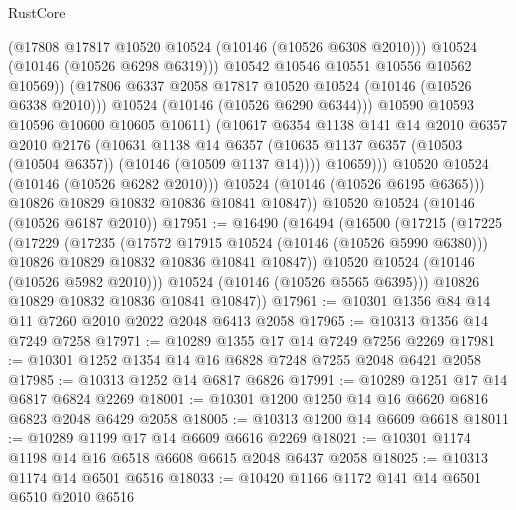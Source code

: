 \begin{lexlean}{RustCore}
\begin{coremodule}
                          (@17808 @17817 @10520 @10524 (@10146 (@10526 @6308 @2010)))
                          @10524
                          (@10146 (@10526 @6298 @6319)))
                        @10542
                        @10546
                        @10551
                        @10556
                        @10562
                        @10569))
                    (@17806 @6337 @2058 @17817 @10520 @10524 (@10146 (@10526 @6338 @2010)))
                    @10524
                    (@10146 (@10526 @6290 @6344)))
                  @10590
                  @10593
                  @10596
                  @10600
                  @10605
                  @10611)
                (@10617
                  @6354
                  @1138
                  @141
                  @14
                  @2010
                  @6357
                  @2010
                  @2176
                  (@10631
                    @1138
                    @14
                    @6357
                    (@10635 @1137 @6357 (@10503 (@10504 @6357)) (@10146 (@10509 @1137 @14))))
                  @10659)))
            @10520
            @10524
            (@10146 (@10526 @6282 @2010)))
          @10524
          (@10146 (@10526 @6195 @6365)))
        @10826
        @10829
        @10832
        @10836
        @10841
        @10847))
    @10520
    @10524
    (@10146 (@10526 @6187 @2010))
@17951 := @16490
    (@16494
      (@16500
        (@17215
          (@17225
            (@17229
              (@17235
                (@17572 @17915 @10524 (@10146 (@10526 @5990 @6380)))
                @10826
                @10829
                @10832
                @10836
                @10841
                @10847))
            @10520
            @10524
            (@10146 (@10526 @5982 @2010)))
          @10524
          (@10146 (@10526 @5565 @6395)))
        @10826
        @10829
        @10832
        @10836
        @10841
        @10847))
@17961 := @10301 @1356 @84 @14 @11 @7260 @2010 @2022 @2048 @6413 @2058
@17965 := @10313 @1356 @14 @7249 @7258
@17971 := @10289 @1355 @17 @14 @7249 @7256 @2269
@17981 := @10301 @1252 @1354 @14 @16 @6828 @7248 @7255 @2048 @6421 @2058
@17985 := @10313 @1252 @14 @6817 @6826
@17991 := @10289 @1251 @17 @14 @6817 @6824 @2269
@18001 := @10301 @1200 @1250 @14 @16 @6620 @6816 @6823 @2048 @6429 @2058
@18005 := @10313 @1200 @14 @6609 @6618
@18011 := @10289 @1199 @17 @14 @6609 @6616 @2269
@18021 := @10301 @1174 @1198 @14 @16 @6518 @6608 @6615 @2048 @6437 @2058
@18025 := @10313 @1174 @14 @6501 @6516
@18033 := @10420 @1166 @1172 @141 @14 @6501 @6510 @2010 @6516

\end{coremodule}
\end{lexlean}
